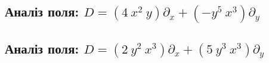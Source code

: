 \subsection*{Аналіз поля: $ D = (4 ~ x^{2} ~ y)\partial_x + ( - y^{5} ~ x^{3})\partial_y $}
\begin{itemize}[leftmargin=1cm]
\end{itemize}
\hrulefill
\subsection*{Аналіз поля: $ D = (2 ~ y^{2} ~ x^{3})\partial_x + (5 ~ y^{3} ~ x^{3})\partial_y $}
\begin{itemize}[leftmargin=1cm]
\end{itemize}
\hrulefill
